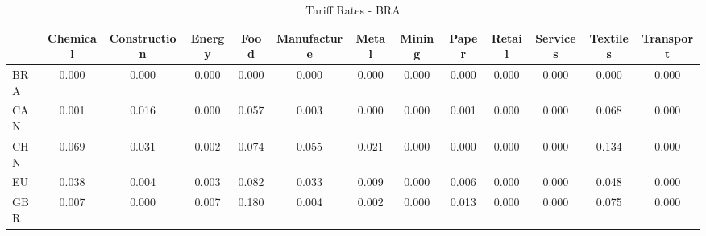 \begin{table}[htbp]
\centering
\caption{Tariff Rates - BRA} 
\label{tab:tariff_BRA}
\begin{tabular}{lcccccccccccc}
  \hline
 & Chemical & Construction & Energy & Food & Manufacture & Metal & Mining & Paper & Retail & Services & Textiles & Transport \\ 
  \hline
BRA & \textcolor[RGB]{255,165,0}{0.000} & \textcolor[RGB]{255,165,0}{0.000} & \textcolor[RGB]{255,165,0}{0.000} & \textcolor[RGB]{255,165,0}{0.000} & \textcolor[RGB]{255,165,0}{0.000} & \textcolor[RGB]{255,165,0}{0.000} & \textcolor[RGB]{255,165,0}{0.000} & \textcolor[RGB]{255,165,0}{0.000} & \textcolor[RGB]{255,165,0}{0.000} & \textcolor[RGB]{255,165,0}{0.000} & \textcolor[RGB]{255,165,0}{0.000} & \textcolor[RGB]{255,165,0}{0.000} \\ 
  CAN & \textcolor[RGB]{142,92,113}{0.001} & \textcolor[RGB]{98,63,157}{0.016} & \textcolor[RGB]{255,165,0}{0.000} & \textcolor[RGB]{51,33,204}{0.057} & \textcolor[RGB]{125,81,130}{0.003} & \textcolor[RGB]{147,95,108}{0.000} & \textcolor[RGB]{255,165,0}{0.000} & \textcolor[RGB]{136,88,119}{0.001} & \textcolor[RGB]{255,165,0}{0.000} & \textcolor[RGB]{255,165,0}{0.000} & \textcolor[RGB]{40,26,215}{0.068} & \textcolor[RGB]{255,165,0}{0.000} \\ 
  CHN & \textcolor[RGB]{36,23,219}{0.069} & \textcolor[RGB]{83,54,172}{0.031} & \textcolor[RGB]{132,85,123}{0.002} & \textcolor[RGB]{32,21,223}{0.074} & \textcolor[RGB]{53,34,202}{0.055} & \textcolor[RGB]{94,61,162}{0.021} & \textcolor[RGB]{255,165,0}{0.000} & \textcolor[RGB]{149,96,106}{0.000} & \textcolor[RGB]{255,165,0}{0.000} & \textcolor[RGB]{255,165,0}{0.000} & \textcolor[RGB]{11,7,244}{0.134} & \textcolor[RGB]{255,165,0}{0.000} \\ 
  EU & \textcolor[RGB]{72,47,183}{0.038} & \textcolor[RGB]{121,78,134}{0.004} & \textcolor[RGB]{125,81,130}{0.003} & \textcolor[RGB]{25,16,230}{0.082} & \textcolor[RGB]{81,52,174}{0.033} & \textcolor[RGB]{108,70,147}{0.009} & \textcolor[RGB]{255,165,0}{0.000} & \textcolor[RGB]{117,76,138}{0.006} & \textcolor[RGB]{255,165,0}{0.000} & \textcolor[RGB]{255,165,0}{0.000} & \textcolor[RGB]{57,37,198}{0.048} & \textcolor[RGB]{255,165,0}{0.000} \\ 
  GBR & \textcolor[RGB]{113,73,142}{0.007} & \textcolor[RGB]{255,165,0}{0.000} & \textcolor[RGB]{113,73,142}{0.007} & \textcolor[RGB]{4,3,251}{0.180} & \textcolor[RGB]{119,77,136}{0.004} & \textcolor[RGB]{130,84,125}{0.002} & \textcolor[RGB]{255,165,0}{0.000} & \textcolor[RGB]{106,69,149}{0.013} & \textcolor[RGB]{255,165,0}{0.000} & \textcolor[RGB]{255,165,0}{0.000} & \textcolor[RGB]{30,19,225}{0.075} & \textcolor[RGB]{255,165,0}{0.000} \\ 

\end{tabular}
\end{table}
